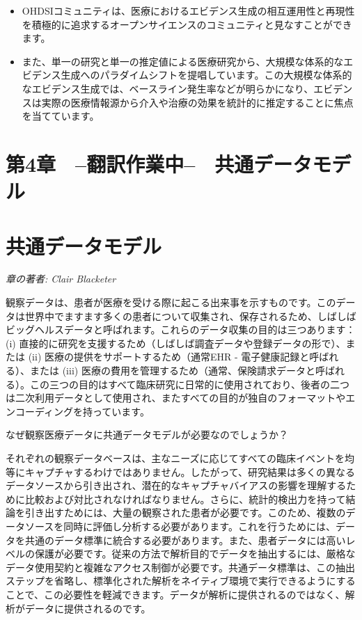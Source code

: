 \documentclass[
  11pt]{book}
\makeatletter
\newenvironment{kframe}{%
\medskip{}
\setlength{\fboxsep}{.8em}
 \def\at@end@of@kframe{}%
 \ifinner\ifhmode%
  \def\at@end@of@kframe{\end{minipage}}%
  \begin{minipage}{\columnwidth}%
 \fi\fi%
 \def\FrameCommand##1{\hskip\@totalleftmargin \hskip-\fboxsep
 \colorbox{myShadeColor}{##1}\hskip-\fboxsep
     \hskip-\linewidth \hskip-\@totalleftmargin \hskip\columnwidth}%
 \MakeFramed {\advance\hsize-\width
   \@totalleftmargin\z@ \linewidth\hsize
   \@setminipage}}%
 {\par\unskip\endMakeFramed%
 \at@end@of@kframe}
\newenvironment{rmdblock}[1]
  {
  \begin{itemize}
  \renewcommand{\labelitemi}{
    \raisebox{-.7\height}[0pt][0pt]{
      {\setkeys{Gin}{width=3em,keepaspectratio}\texttt{[image: images/\#1]}}
    }
  }
  \setlength{\fboxsep}{1em}
  \begin{kframe}
  \item
  }
  {
  \end{kframe}
  \end{itemize}
  }
\newenvironment{rmdsummary}
  {\begin{rmdblock}{summary}}
  {\end{rmdblock}}
\theoremstyle{definition}
\theoremstyle{definition}
\theoremstyle{definition}
\theoremstyle{definition}
\theoremstyle{remark}
\makeatother
\begin{document}
\begin{rmdsummary}
\begin{itemize}
\item
  OHDSIコミュニティは、医療におけるエビデンス生成の相互運用性と再現性を積極的に追求するオープンサイエンスのコミュニティと見なすことができます。
\item
  また、単一の研究と単一の推定値による医療研究から、大規模な体系的なエビデンス生成へのパラダイムシフトを提唱しています。この大規模な体系的なエビデンス生成では、ベースライン発生率などが明らかになり、エビデンスは実際の医療情報源から介入や治療の効果を統計的に推定することに焦点を当てています。
\end{itemize}
\end{rmdsummary}

\chapter*{第4章　--翻訳作業中--　共通データモデル}\label{ux7b2c4ux7ae0-ux7ffbux8a33ux4f5cux696dux4e2d-ux5171ux901aux30c7ux30fcux30bfux30e2ux30c7ux30eb}

\chapter{共通データモデル}\label{CommonDataModel}

\emph{章の著者: Clair Blacketer}

観察データは、患者が医療を受ける際に起こる出来事を示すものです。このデータは世界中でますます多くの患者について収集され、保存されるため、しばしばビッグヘルスデータと呼ばれます。これらのデータ収集の目的は三つあります：(i) 直接的に研究を支援するため（しばしば調査データや登録データの形で）、または (ii) 医療の提供をサポートするため（通常EHR - 電子健康記録と呼ばれる）、または (iii) 医療の費用を管理するため（通常、保険請求データと呼ばれる）。この三つの目的はすべて臨床研究に日常的に使用されており、後者の二つは二次利用データとして使用され、またすべての目的が独自のフォーマットやエンコーディングを持っています。   

なぜ観察医療データに共通データモデルが必要なのでしょうか？

それぞれの観察データベースは、主なニーズに応じてすべての臨床イベントを均等にキャプチャするわけではありません。したがって、研究結果は多くの異なるデータソースから引き出され、潜在的なキャプチャバイアスの影響を理解するために比較および対比されなければなりません。さらに、統計的検出力を持って結論を引き出すためには、大量の観察された患者が必要です。このため、複数のデータソースを同時に評価し分析する必要があります。これを行うためには、データを共通のデータ標準に統合する必要があります。また、患者データには高いレベルの保護が必要です。従来の方法で解析目的でデータを抽出するには、厳格なデータ使用契約と複雑なアクセス制御が必要です。共通データ標準は、この抽出ステップを省略し、標準化された解析をネイティブ環境で実行できるようにすることで、この必要性を軽減できます。データが解析に提供されるのではなく、解析がデータに提供されるのです。
\end{document}
